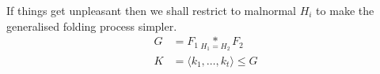 \documentclass[a4paper,12pt]{article}
\numberwithin{equation}{section}
\numberwithin{figure}{section}
\begin{document}
If things get unpleasant then we  shall restrict to malnormal $H_i$ to make the generalised folding process simpler.
\begin{align*} 
G &= F_1 \underset{H_1=H_2}{\ast}F_2 \\ 
K &= \langle k_1, \ldots, k_t \rangle \leqslant G
\end{align*}
%
%


\end{document}
